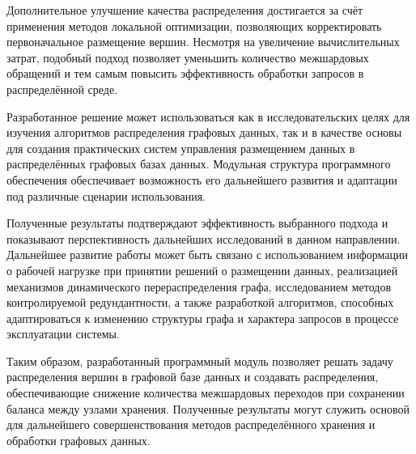 Дополнительное улучшение качества распределения достигается за счёт применения методов локальной оптимизации, позволяющих корректировать первоначальное размещение вершин. Несмотря на увеличение вычислительных затрат, подобный подход позволяет уменьшить количество межшардовых обращений и тем самым повысить эффективность обработки запросов в распределённой среде.

Разработанное решение может использоваться как в исследовательских целях для изучения алгоритмов распределения графовых данных, так и в качестве основы для создания практических систем управления размещением данных в распределённых графовых базах данных. Модульная структура программного обеспечения обеспечивает возможность его дальнейшего развития и адаптации под различные сценарии использования.

Полученные результаты подтверждают эффективность выбранного подхода и показывают перспективность дальнейших исследований в данном направлении. Дальнейшее развитие работы может быть связано с использованием информации о рабочей нагрузке при принятии решений о размещении данных, реализацией механизмов динамического перераспределения графа, исследованием методов контролируемой редундантности, а также разработкой алгоритмов, способных адаптироваться к изменению структуры графа и характера запросов в процессе эксплуатации системы.

Таким образом, разработанный программный модуль позволяет решать задачу распределения вершин в графовой базе данных и создавать распределения, обеспечивающие снижение количества межшардовых переходов при сохранении баланса между узлами хранения. Полученные результаты могут служить основой для дальнейшего совершенствования методов распределённого хранения и обработки графовых данных.
